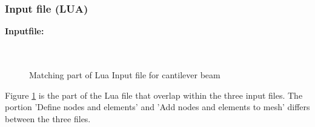 \clearpage

\subsubsection*{Input file (LUA)}
\begin{flushleft}
  \textbf{Inputfile:}
  \\
  \\
  \\
\end{flushleft}
\hspace{1in}
\begin{figure}[htbp]
  {\footnotesize
  }
  \caption{Matching part of Lua Input file for cantilever beam}
  \label{fig:LuaFile:beam_test_mutual.lua}
\end{figure}

\clearpage
Figure \ref{fig:LuaFile:beam_test_mutual.lua} is the
part of the Lua file that overlap within the three input
files. The portion 'Define nodes and elements' and 
'Add nodes and elements to mesh' differs between the three files. 

